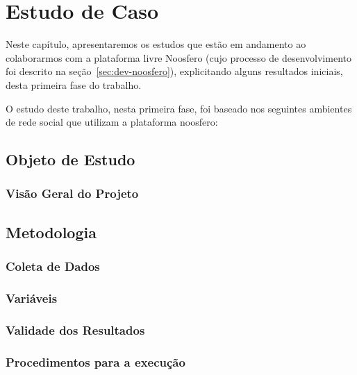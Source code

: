 \chapter{Estudo de Caso}

Neste capítulo, apresentaremos os estudos que estão em andamento ao colaborarmos com a plataforma livre Noosfero (cujo processo de desenvolvimento foi descrito na seção~\ref{sec:dev-noosfero}), explicitando alguns resultados iniciais, desta primeira fase do trabalho.

O estudo deste trabalho, nesta primeira fase, foi baseado nos seguintes ambientes de
rede social que utilizam a plataforma noosfero:
%

\section{Objeto de Estudo}

\subsection{Visão Geral do Projeto}



\section{Metodologia}

\subsection{Coleta de Dados}



\subsection{Variáveis}
 

\subsection{Validade dos Resultados}



\subsection{Procedimentos para a execução}


